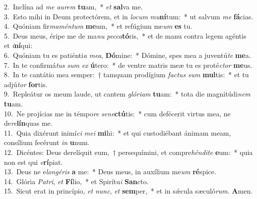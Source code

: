 {2.~}Inclína ad \textit{me} \textit{au}\textit{rem} \textbf{tu}am,~* \textit{et} \textbf{sal}va me.\\
{3.~}Esto mihi in Deum protectórem, et in \textit{lo}\textit{cum} \textit{mu}\textbf{ní}tum:~* ut salvum \textit{me} \textbf{fá}cias.\\
{4.~}Quóniam fir\textit{ma}\textit{mén}\textit{tum} \textbf{me}um,~* et refúgium me\textit{um} \textbf{es} tu.\\
{5.~}Deus meus, éripe me de ma\textit{nu} \textit{pec}\textit{ca}\textbf{tó}ris,~* et de manu contra legem agéntis et \textit{i}\textbf{ní}qui:\\
{6.~}Quóniam tu es patiénti\textit{a} \textit{me}\textit{a}, \textbf{Dó}mine:~* Dómine, spes mea a juventú\textit{te} \textbf{me}a.\\
{7.~}In te confirmá\textit{tus} \textit{sum} \textit{ex} \textbf{ú}tero:~* de ventre matris meæ tu es proté\textit{ctor} \textbf{me}us.\\
{8.~}In te cantátio mea semper:~† tamquam prodígium \textit{fa}\textit{ctus} \textit{sum} \textbf{mul}tis:~* et tu adjú\textit{tor} \textbf{for}tis.\\
{9.~}Repleátur os meum laude, ut cantem \textit{gló}\textit{ri}\textit{am} \textbf{tu}am:~* tota die magnitúdi\textit{nem} \textbf{tu}am.\\
{10.~}Ne projícias me in témpo\textit{re} \textit{se}\textit{ne}\textbf{ctú}tis:~* cum defécerit virtus mea, ne de\textit{re}\textbf{lín}quas me.\\
{11.~}Quia dixérunt inimí\textit{ci} \textit{me}\textit{i} \textbf{mi}hi:~* et qui custodiébant ánimam meam, consílium fecérunt \textit{in} \textbf{u}num.\\
{12.~}Dicéntes: Deus derelíquit eum,~† persequímini, et compre\textit{hén}\textit{di}\textit{te} \textbf{e}um:~* quia non est qui \textit{e}\textbf{rí}piat.\\
{13.~}Deus ne e\textit{lon}\textit{gé}\textit{ris} \textbf{a} me:~* Deus meus, in auxílium me\textit{um} \textbf{ré}spice.\\
{14.~}Glória \textit{Pa}\textit{tri}, \textit{et} \textbf{Fí}lio,~* et Spirítu\textit{i} \textbf{San}cto.\\
{15.~}Sicut erat in princípio, \textit{et} \textit{nunc}, \textit{et} \textbf{sem}per,~* et in sǽcula sæculó\textit{rum}. \textbf{A}men.\\
